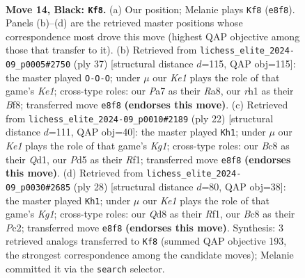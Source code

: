 \documentclass[11pt]{article}
\begin{document}
\clearpage

\begin{figure}[p]\centering
\begin{subfigure}{0.46\textwidth}\centering
\resizebox{\linewidth}{!}{%
\newchessgame
\chessboard[
  setfen={r1bqk3/pp1n1pp1/4p3/2bpP3/Q2n1P1r/P7/1P4PP/R1B1KNNR b KQq - 2 14},
  showmover=false,
  pgfstyle=straightmove, color=movearrow, markmove={e8-f8}
]}
\caption{}
\end{subfigure}\hfill
\begin{subfigure}{0.46\textwidth}\centering
\resizebox{\linewidth}{!}{%
\newchessgame
\chessboard[
  setfen={r3kbr1/1bqn1p1p/pp1p4/3PnN2/2P4R/1P6/PBB1Q1PP/4R1K1 b q - 2 19},
  showmover=false,
  pgfstyle=straightmove, color=movearrow, markmove={e8-c8}
]}
\caption{}
\end{subfigure}
\\[4pt]
\begin{subfigure}{0.46\textwidth}\centering
\resizebox{\linewidth}{!}{%
\newchessgame
\chessboard[
  setfen={r1b1k2r/ppb2ppp/2p2n2/4P3/2Nq1p2/3B4/PPP3PP/R1BQ1RK1 w kq - 1 12},
  showmover=false,
  pgfstyle=straightmove, color=movearrow, markmove={g1-h1}
]}
\caption{}
\end{subfigure}\hfill
\begin{subfigure}{0.46\textwidth}\centering
\resizebox{\linewidth}{!}{%
\newchessgame
\chessboard[
  setfen={r1b1k2r/1p1n1ppp/p3p3/q1bpP3/3B1P2/1RN5/P1PQB1PP/5RK1 w kq - 1 15},
  showmover=false,
  pgfstyle=straightmove, color=movearrow, markmove={g1-h1}
]}
\caption{}
\end{subfigure}
\caption{\textbf{Move 14, Black: \texttt{Kf8}.} (a) Our position; Melanie plays \texttt{Kf8} (\texttt{e8f8}). Panels (b)--(d) are the retrieved master positions whose correspondence most drove this move (highest QAP objective among those that transfer to it). (b) Retrieved from \texttt{lichess\_elite\_2024-09\_p0005\#2750} (ply 37) [structural distance $d$=115, QAP obj=115]: the master played \texttt{O-O-O}; under $\mu$ our \emph{Ke1} plays the role of that game's \emph{Ke1}; cross-type roles: our \emph{P}a7 as their \emph{R}a8, our \emph{r}h1 as their \emph{B}f8; transferred move \texttt{e8f8} \textbf{(endorses this move)}. (c) Retrieved from \texttt{lichess\_elite\_2024-09\_p0010\#2189} (ply 22) [structural distance $d$=111, QAP obj=40]: the master played \texttt{Kh1}; under $\mu$ our \emph{Ke1} plays the role of that game's \emph{Kg1}; cross-type roles: our \emph{B}c8 as their \emph{Q}d1, our \emph{P}d5 as their \emph{R}f1; transferred move \texttt{e8f8} \textbf{(endorses this move)}. (d) Retrieved from \texttt{lichess\_elite\_2024-09\_p0030\#2685} (ply 28) [structural distance $d$=80, QAP obj=38]: the master played \texttt{Kh1}; under $\mu$ our \emph{Ke1} plays the role of that game's \emph{Kg1}; cross-type roles: our \emph{Q}d8 as their \emph{R}f1, our \emph{B}c8 as their \emph{P}c2; transferred move \texttt{e8f8} \textbf{(endorses this move)}. Synthesis: 3 retrieved analogs transferred to \texttt{Kf8} (summed QAP objective 193, the strongest correspondence among the candidate moves); Melanie committed it via the \texttt{search} selector.}
\label{fig:thought-m27}
\end{figure}
\end{document}
